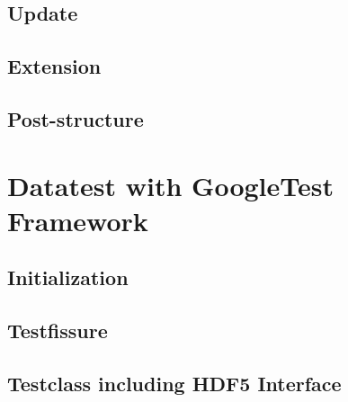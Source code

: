 \documentclass{article}
\begin{document}
\subsection{Update}
\subsection{Extension}
\subsection{Post-structure}



\section{Datatest with GoogleTest Framework}
\subsection{Initialization}
\subsection{Testfissure}
\subsection{Testclass including HDF5 Interface}






\end{document}
